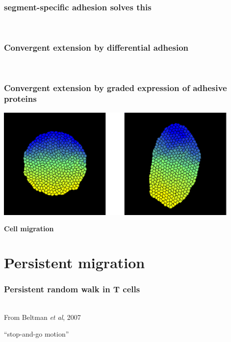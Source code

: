 \documentclass[compress]{beamer}
\begin{document}
\begin{frame}
\frametitle{segment-specific adhesion solves this}   
\begin{center}
 \\
\end{center}
\end{frame}


\begin{frame}
\frametitle{Convergent extension \textbf{by} differential adhesion}   
 \\
\end{frame}

\begin{frame}
\frametitle{Convergent extension by graded expression of adhesive proteins}   
\begin{center}
 \includegraphics[width=0.9\textwidth]{figures/gradedadhesion.pdf}\\
\end{center}
\end{frame}

\begin{frame}[plain]
\begin{center}
 \textbf{Cell migration}
\end{center}
\end{frame}

\section{Persistent migration}
\begin{frame}
\frametitle{Persistent random walk in T cells}   
\begin{center}
 \\
\tiny From Beltman \textit{et al}, 2007
\end{center}
``stop-and-go motion''
\end{frame}
\end{document}
